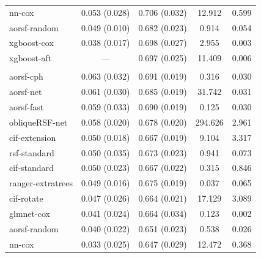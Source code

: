 \documentclass{article}\usepackage[]{graphicx}\usepackage[]{xcolor}
\newenvironment{knitrout}{}{} %
\begin{document}
\begin{knitrout}
\begin{longtable}[t]{lcccc}
\hspace{1em}nn-cox & 0.053 (0.028) & 0.706 (0.032) & 12.912 & 0.599\\
\hspace{1em}aorsf-random & 0.049 (0.010) & 0.682 (0.023) & 0.914 & 0.054\\
\hspace{1em}xgboost-cox & 0.038 (0.017) & 0.698 (0.027) & 2.955 & 0.003\\
\hspace{1em}xgboost-aft & --- & 0.697 (0.025) & 11.409 & 0.006\\
\addlinespace[0.3em]
\multicolumn{5}{l}{\textit{\textbf{Lung cancer; death, n = 442, p = 24}}}\\
\hline
\hspace{1em}aorsf-cph & 0.063 (0.032) & 0.691 (0.019) & 0.316 & 0.030\\
\hspace{1em}aorsf-net & 0.061 (0.030) & 0.685 (0.019) & 31.742 & 0.031\\
\hspace{1em}aorsf-fast & 0.059 (0.033) & 0.690 (0.019) & 0.125 & 0.030\\
\hspace{1em}obliqueRSF-net & 0.058 (0.020) & 0.678 (0.020) & 294.626 & 2.961\\
\hspace{1em}cif-extension & 0.050 (0.018) & 0.667 (0.019) & 9.104 & 3.317\\
\hspace{1em}rsf-standard & 0.050 (0.035) & 0.673 (0.023) & 0.941 & 0.073\\
\hspace{1em}cif-standard & 0.050 (0.023) & 0.667 (0.022) & 0.315 & 0.846\\
\hspace{1em}ranger-extratrees & 0.049 (0.016) & 0.675 (0.019) & 0.037 & 0.065\\
\hspace{1em}cif-rotate & 0.047 (0.026) & 0.664 (0.021) & 17.129 & 3.089\\
\hspace{1em}glmnet-cox & 0.041 (0.024) & 0.664 (0.034) & 0.123 & 0.002\\
\hspace{1em}aorsf-random & 0.040 (0.022) & 0.651 (0.023) & 0.538 & 0.026\\
\hspace{1em}nn-cox & 0.033 (0.025) & 0.647 (0.029) & 12.472 & 0.368\\

\end{longtable}
\end{knitrout}
\end{document}

